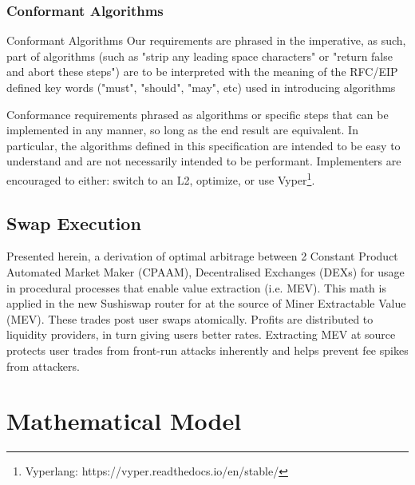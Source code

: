 \documentclass[runningheads]{llncs}
\begin{document}

\subsection{Conformant Algorithms}	

Conformant Algorithms
Our requirements are phrased in the imperative, as such, part of algorithms (such as "strip any leading space characters" or "return false and abort these steps") are to be interpreted with the meaning of the RFC/EIP defined key words ("must", "should", "may", etc) used in introducing algorithms

\hfill \break

Conformance requirements phrased as algorithms or specific steps that can be implemented in any manner, so long as the end result are equivalent. In particular, the algorithms defined in this specification are intended to be easy to understand and are not necessarily intended to be performant. Implementers are encouraged to either: switch to an L2, optimize, or use Vyper\footnote{Vyperlang: https://vyper.readthedocs.io/en/stable/}.


\section{Swap Execution}
	

Presented herein, a derivation of optimal arbitrage between 2 Constant Product Automated Market Maker (CPAAM), Decentralised Exchanges (DEXs) for usage in procedural processes that enable value extraction (i.e. MEV).
This math is applied in the new Sushiswap router for at the source of  Miner Extractable Value (MEV). These trades post user swaps atomically. 
Profits are distributed to liquidity providers, in turn giving users better rates. Extracting MEV at source protects user trades from front-run attacks inherently and helps prevent fee spikes from attackers.



	\newpage
	
\chapter{Mathematical Model}
\end{document}
